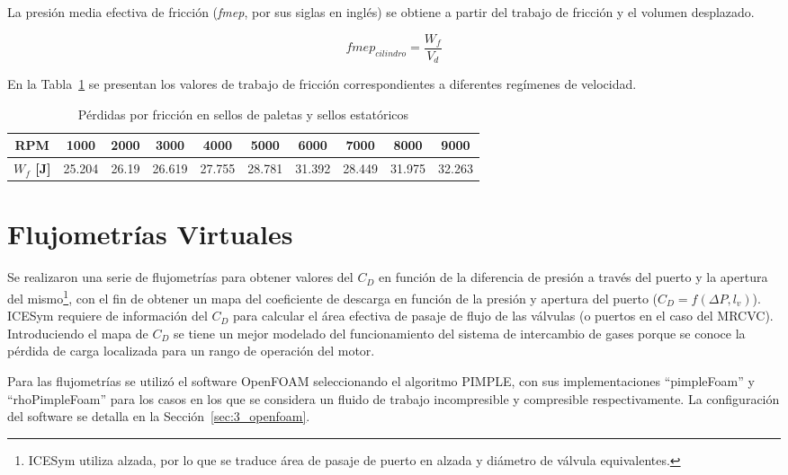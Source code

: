 La presión media efectiva de fricción (\textit{fmep}, por sus siglas en inglés)
se obtiene a partir del trabajo de fricción y el volumen desplazado.

\begin{equation} fmep_{cilindro} = \frac{W_{f}}{V_{d}}
\end{equation}

En la Tabla~\ref{tab:trabajo_fricción} se presentan los valores de trabajo de
fricción correspondientes a diferentes regímenes de velocidad.

\begin{table}[h!]  \centering
  \begin{tabular}{cccccccccc} \toprule \textbf{RPM} & 1000 & 2000 & 3000 & 4000
& 5000 & 6000 & 7000 & 8000 & 9000 \\ \midrule \textbf{$W_{f}$ [J]} & 25.204 &
26.19 & 26.619 & 27.755 & 28.781 & 31.392 & 28.449 & 31.975 & 32.263 \\
\bottomrule
  \end{tabular}
  \caption{Pérdidas por fricción en sellos de paletas y sellos
estatóricos}\label{tab:trabajo_fricción}
\end{table}



\section{Flujometrías Virtuales}
%
Se realizaron una serie de flujometrías para obtener valores del $C_{D}$ en
función de la diferencia de presión a través del puerto y la apertura del
mismo\footnote{ICESym utiliza alzada, por lo que se traduce área de pasaje de
puerto en alzada y diámetro de válvula equivalentes.}, con el fin de obtener un mapa del
coeficiente de descarga en función de la presión y apertura del puerto
($C_{D} = f(\Delta P,l_v)$).
%
ICESym requiere de información del $C_{D}$ para calcular el área efectiva de
pasaje de flujo de las válvulas (o puertos en el caso del MRCVC).
%
Introduciendo el mapa de $C_{D}$ se tiene un mejor modelado del funcionamiento
del sistema de intercambio de gases porque se conoce la pérdida de carga
localizada para un rango de operación del motor.

Para las flujometrías se utilizó el software OpenFOAM seleccionando el algoritmo
PIMPLE, con sus implementaciones ``pimpleFoam'' y ``rhoPimpleFoam'' para los
casos en los que se considera un fluido de trabajo incompresible y compresible
respectivamente.
%
La configuración del software se detalla en la Sección~\ref{sec:3_openfoam}.

